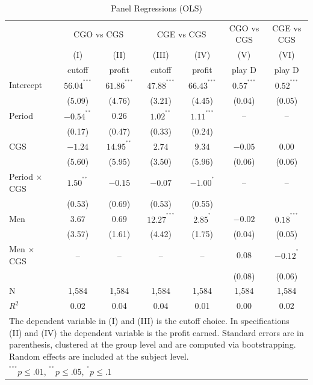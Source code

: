 \documentclass[11pt,english]{article}
\begin{document}
\begin{table}[ht]
\centering
\caption{Panel Regressions (OLS)}
\footnotesize
\begin{tabular}{lcc|cc|cc}
  \hline
  &\multicolumn{2}{c|}{CGO vs CGS} &\multicolumn{2}{c|}{CGE vs CGS} & CGO vs CGS& CGE vs CGS\\
  & (I) & (II) & (III) & (IV) & (V) & (VI)\\
&  cutoff & profit & cutoff & profit & play D & play D \\
    \hline
Intercept & $56.04^{^{***}}$ &  $ 61.86^{^{***}}$ & $47.88^{^{***}}$ &  $66.43^{^{***}}$ & $0.57^{^{***}}$& $0.52^{^{***}}$\\
& (5.09) & (4.76) & (3.21) & (4.45) & (0.04) & (0.05)\\
Period & $-0.54^{^{**}}$ & $0.26$ & $1.02^{^{**}}$ & $1.11^{^{***}}$ & -- & -- \\
& (0.17)&  (0.47) & (0.33)&  (0.24) & & \\
CGS & $-1.24$ &  $14.95^{^{**}}$ & $  2.74$ &  $9.34$ &  $-0.05$ & 0.00\\
& (5.60) & (5.95) & (3.50) & (5.96) & (0.06) & (0.06)\\
Period $\times$ CGS & $1.50^{^{**}}$& $-0.15$ & $-0.07$&$-1.00^{^{*}}$ & -- & -- \\
& (0.53) & (0.69) & (0.53) & (0.55) & &  \\
Men & $3.67$ &  $0.69$ & $12.27^{^{***}}$ &  $2.85^{^{*}}$ & $-0.02$ & $0.18^{^{***}}$ \\
& (3.57) & (1.61) & (4.42) & (1.75) & (0.04) & (0.05)\\
Men $\times$ CGS & --& --& --& -- & 0.08 & $-0.12^{^{*}}$\\
& & & & & (0.08) & (0.06)\\
\hline
N & 1,584 & 1,584 & 1,584 & 1,584 & 1,584  & 1,584 \\ 
$R^2$ & 0.02 & 0.04 & 0.04 & 0.01 & 0.00 & 0.02\\
\hline
\hline
 \multicolumn{7}{p{.9\textwidth}}{\scriptsize{The dependent variable in (I) and (III) is the cutoff choice. In specifications (II) and (IV) the dependent variable is the profit earned. Standard errors are in parenthesis, clustered at the group level and are computed via bootstrapping. Random effects are included at the subject level. }}\\ 
 \multicolumn{3}{p{0.4\textwidth}}{\scriptsize{ $^{^{***}}p\leq.01$,
    $^{^{**}}p\leq.05$, $^{^{*}}p\leq.1$}} \\
\end{tabular}
\label{table:olscgs}
\end{table}
\end{document}
